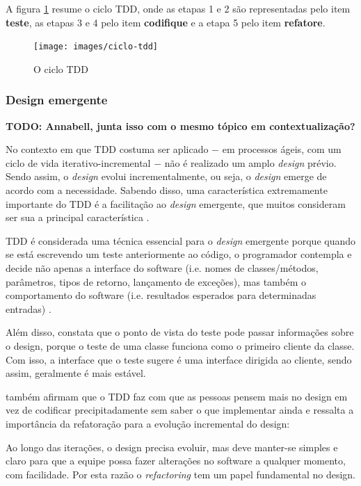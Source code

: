 A figura \ref{img:ciclo-tdd} resume o ciclo TDD, onde as etapas 1 e 2 são representadas pelo item \textbf{teste}, as etapas 3 e 4 pelo item \textbf{codifique} e a etapa 5 pelo item \textbf{refatore}.

\begin{figure}[h]
  \center
  \caption{O ciclo TDD}
  \texttt{[image: images/ciclo-tdd]}
  \label{img:ciclo-tdd}
\end{figure}


\subsubsection{Design emergente}
\label{ssub:design_emergente}

\textbf{TODO: Annabell, junta isso com o mesmo tópico em contextualização?}

No contexto em que TDD costuma ser aplicado $-$ em processos ágeis, com um ciclo de vida iterativo-incremental $-$ não é realizado um amplo \textit{design} prévio. Sendo assim, o \textit{design} evolui incrementalmente, ou seja, o \textit{design} emerge de acordo com a necessidade. Sabendo disso, uma característica extremamente importante do TDD é a facilitação ao \textit{design} emergente, que muitos consideram ser sua a principal característica \cite{EmergentDesign}.

TDD é considerada uma técnica essencial para o \textit{design} emergente porque
quando se está escrevendo um teste anteriormente ao código, o programador contempla e decide não apenas a interface do software (i.e. nomes de classes/métodos, parâmetros, tipos de retorno, lançamento de exceções), mas também o comportamento do software (i.e. resultados esperados para determinadas entradas) \cite{JanzenTDD}.

Além disso,  constata que o ponto de vista do teste pode passar informações sobre o design, porque o teste de uma classe funciona como o primeiro cliente da classe. Com isso, a interface que o teste sugere é uma interface dirigida ao cliente, sendo assim, geralmente é mais estável.

 também afirmam que o TDD faz com que as pessoas pensem mais no design em vez de codificar precipitadamente sem saber o que implementar ainda e  ressalta a importância da refatoração para a evolução incremental do design:

\begin{citacao}
Ao longo das iterações, o design precisa evoluir, mas deve manter-se simples e claro para que a equipe possa fazer alterações no software a qualquer momento, com facilidade. Por esta razão o \textit{refactoring} tem um papel fundamental no design.
\end{citacao}


